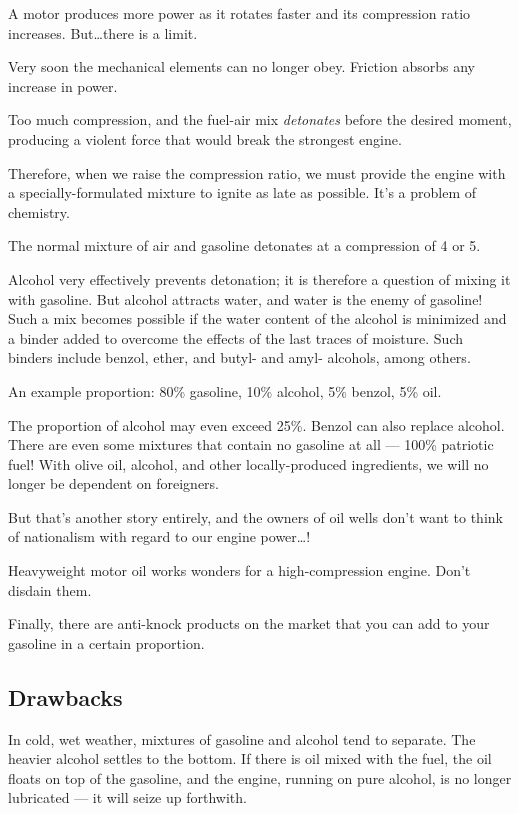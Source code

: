 \documentclass{book}
\begin{document}
A motor produces more power as it rotates faster and its compression
ratio increases.  But\ldots there is a limit.

Very soon the mechanical elements can no longer obey.  Friction
absorbs any increase in power.

Too much compression, and the fuel-air mix \textit{detonates} before
the desired moment, producing a violent force that would break the
strongest engine.

Therefore, when we raise the compression ratio, we must provide the
engine with a specially-formulated mixture to ignite as late as
possible.  It's a problem of chemistry.

The normal mixture of air and gasoline detonates at a compression of 4
or 5.

Alcohol very effectively prevents detonation; it is therefore a
question of mixing it with gasoline.  But alcohol attracts water, and
water is the enemy of gasoline!  Such a mix becomes possible if the
water content of the alcohol is minimized and a binder added to
overcome the effects of the last traces of moisture.  Such binders
include benzol, ether, and butyl- and amyl- alcohols, among others.

An example proportion: 80\% gasoline, 10\% alcohol, 5\% benzol, 5\%
oil.

The proportion of alcohol may even exceed 25\%.  Benzol can also
replace alcohol.  There are even some mixtures that contain no
gasoline at all --- 100\% patriotic fuel!  With olive oil, alcohol,
and other locally-produced ingredients, we will no longer be dependent
on foreigners.

But that's another story entirely, and the owners of oil wells don't
want to think of nationalism with regard to our engine power\ldots!

Heavyweight motor oil works wonders for a high-compression engine.  Don't disdain them.

Finally, there are anti-knock products on the market that you can add
to your gasoline in a certain proportion.

\subsection{Drawbacks}

In cold, wet weather, mixtures of gasoline and alcohol tend to
separate.  The heavier alcohol settles to the bottom.  If there is oil
mixed with the fuel, the oil floats on top of the gasoline, and the
engine, running on pure alcohol, is no longer lubricated --- it will
seize up forthwith.
\end{document}
